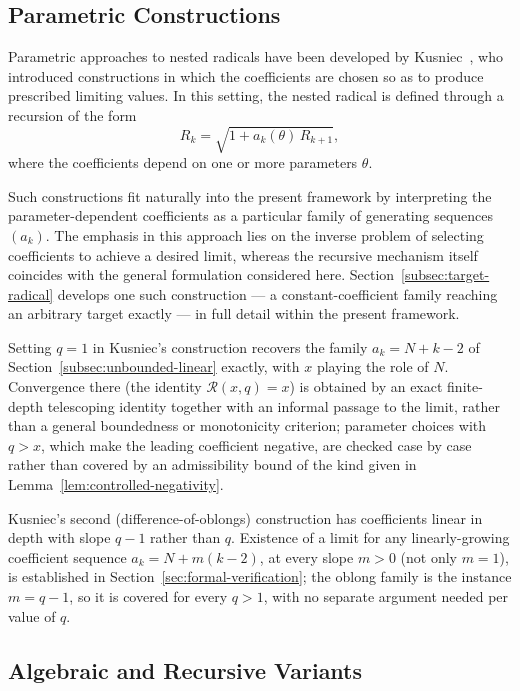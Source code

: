 \documentclass[11pt,a4paper]{amsart}
\theoremstyle{plain}
\theoremstyle{definition}
\theoremstyle{remark}
\begin{document}
\subsection{Parametric Constructions}
\label{subsec:parametric}

Parametric approaches to nested radicals have been developed by Kusniec~\cite{KusniecRadiciators}, who introduced constructions in which the coefficients are chosen so as to produce prescribed limiting values. In this setting, the nested radical is defined through a recursion of the form
\[
R_k = \sqrt{1 + a_k(\theta)\, R_{k+1}},
\]
where the coefficients depend on one or more parameters $\theta$.

Such constructions fit naturally into the present framework by interpreting the parameter-dependent coefficients as a particular family of generating sequences $(a_k)$. The emphasis in this approach lies on the inverse problem of selecting coefficients to achieve a desired limit, whereas the recursive mechanism itself coincides with the general formulation considered here. Section~\ref{subsec:target-radical} develops one such construction — a constant-coefficient family reaching an arbitrary target exactly — in full detail within the present framework.

Setting $q=1$ in Kusniec's construction recovers the family $a_k = N+k-2$ of Section~\ref{subsec:unbounded-linear} exactly, with $x$ playing the role of $N$. Convergence there (the identity $\mathcal{R}(x,q)=x$) is obtained by an exact finite-depth telescoping identity together with an informal passage to the limit, rather than a general boundedness or monotonicity criterion; parameter choices with $q>x$, which make the leading coefficient negative, are checked case by case rather than covered by an admissibility bound of the kind given in Lemma~\ref{lem:controlled-negativity}.

Kusniec's second (difference-of-oblongs) construction has coefficients linear in depth with slope $q-1$ rather than $q$. Existence of a limit for any linearly-growing coefficient sequence $a_k = N+m(k-2)$, at every slope $m>0$ (not only $m=1$), is established in Section~\ref{sec:formal-verification}; the oblong family is the instance $m=q-1$, so it is covered for every $q>1$, with no separate argument needed per value of $q$.

\subsection{Algebraic and Recursive Variants}
\label{subsec:algebraic-recursive}
\end{document}
